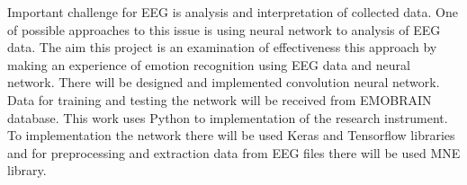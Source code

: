 \documentclass[10pt,journal,compsoc]{IEEEtran}
\begin{document}
Important challenge for EEG is analysis and interpretation of collected data. One of possible approaches to this issue is using neural network to analysis of EEG data. The aim this project is an examination of  effectiveness this approach by making an experience of emotion recognition using EEG data and neural network. There will be designed and implemented convolution neural network. Data for training and testing the network will be received from EMOBRAIN database. This work uses Python to implementation of the research instrument. To implementation the network there will be used Keras and Tensorflow libraries and for preprocessing and extraction data from EEG files there will be used MNE library.


 





%
%
\end{document}
